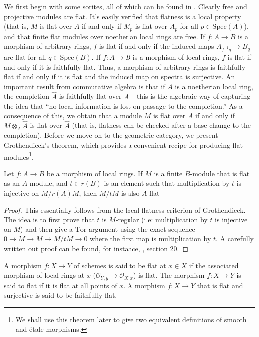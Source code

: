 \noindent
We first begin with some sorites, all of which can be found in \cite{MatCA}.
Clearly free and projective modules are flat. It's easily verified that
flatness is a local property (that is, $M$ is flat over $A$ if and only if
$M_p$ is flat over $A_p$ for all $p \in \text{Spec}(A)$), and that finite flat
modules over noetherian local rings are free. If $f:A \to B$ is a morphism of
arbitrary rings, $f$ is flat if and only if the induced maps
$A_{f^{-1}q} \to B_q$ are flat for all $q \in \text{Spec}(B)$. If $f:A \to B$ 
is a
morphism of local rings, $f$ is flat if and only if it is faithfully flat.
Thus, a morphism of arbitrary rings is faithfully flat if and only if it is
flat and the induced map on spectra is surjective. An important result from
commutative algebra is that if $A$ is a noetherian local ring, the completion
$\widehat{A}$ is faithfully flat over $A$ -- this is the algebraic way of
capturing the idea that ``no local information is lost on passage to the
completion.'' As a consequence of this, we obtain that a module $M$ is flat
over $A$ if and only if $M \otimes_A \widehat{A}$ is flat over $\widehat{A}$
(that is, flatness can be checked after a base change to the completion).
Before we move on to the geometric category, we present Grothendieck's
theorem, which provides a convenient recipe for producing flat
modules\footnote{We shall use this theorem later to give two equivalent
definitions of smooth and \'etale morphisms.}.

\begin{theorem}[Grothendieck]
\label{theorem-flatness-grothendieck}
Let $f:A \to B$ be a morphism of local rings. If $M$ is a finite $B$-module
that is flat as an $A$-module, and $t \in r(B)$ is an element such that
multiplication by $t$ is injective on $M/r(A)M$, then $M/tM$ is also
$A$-flat
\end{theorem}

\begin{proof}
This essentially follows from the local flatness criterion of Grothendieck.
The idea is to first prove that $t$ is $M$-regular (i.e: multiplication by
$t$ is injective on $M$) and then give a $\mathrm{Tor}$ argument using the
exact sequence $0 \to M \to M \to M/tM \to 0$ where the first map is
multiplication by $t$. A carefully written out proof can be found, for
instance, \cite{MatCA}, section 20.
\end{proof}

\begin{definition}
\label{definition-flat-schemes}
A morphism $f:X \to Y$ of schemes is said to be flat at $x \in X$ if the
associated morphism of local rings at $x$ 
($\mathcal{O}_{Y,y} \to \mathcal{O}_{X,x}$) is flat.
The morphism $f:X \to Y$ is said to flat if it is flat at all points of $x$.
A morphism $f:X \to Y$ that is flat and surjective is said to be faithfully
flat.
\end{definition}

